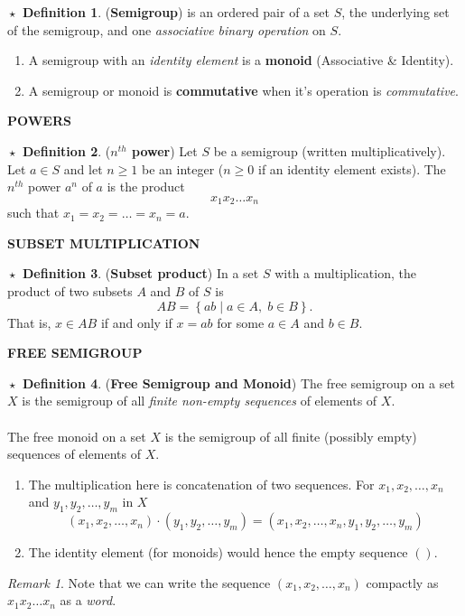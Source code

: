 \documentclass{article}
\theoremstyle{definition}
\newtheorem{definition}{$\boxed{\star}$ Definition}
\theoremstyle{remark}
\newtheorem*{remark}{Remark}
\theoremstyle{definition}
\theoremstyle{definition}
\theoremstyle{definition}
\theoremstyle{proof}
\begin{document}
\hrulefill
\begin{definition}
	(\textbf{Semigroup}) is an ordered pair of a set $ S $, the underlying set of the semigroup, and one \textit{associative binary operation} on $ S $.
	\begin{enumerate}
		\item{A semigroup with an \textit{identity element} is a \textbf{monoid} (Associative \& Identity).}
		\item{A semigroup or monoid is \textbf{commutative} when it's operation is \textit{commutative}.}
	\end{enumerate}
\end{definition}
\hrulefill
\textbf{POWERS}
\hrulefill
\begin{definition}
	(\textbf{$ n^{th} $ power}) Let $ S $ be a semigroup (written multiplicatively). Let $ a\in S $ and let $ n\ge 1 $ be an integer ($ n\ge 0 $ if an identity element exists). The $ n^{th} $ power $ a^n $ of $ a $ is the product
	\[x_1x_2\dots x_n\]
	such that $ x_1 = x_2 = \dots = x_n = a $.
\end{definition}
\hrulefill
\textbf{SUBSET MULTIPLICATION}
\hrulefill
\begin{definition}
	(\textbf{Subset product}) In a set $ S $ with a multiplication, the product of two subsets $ A $ and $ B $ of $ S $ is 
	\[AB = \left \{ab \;\vert\; a\in A,\; b\in B\right \}.\]
	That is, $ x\in AB $ if and only if $ x = ab $ for some $ a\in A $ and $ b\in B $.
\end{definition}
\hrulefill
\textbf{FREE SEMIGROUP}
\hrulefill
\begin{definition}
	(\textbf{Free Semigroup and Monoid})  The free semigroup on a set $ X $ is the semigroup of all \textit{finite non-empty sequences} of elements of $ X $.\\\\
	The free monoid on a set $ X $ is the semigroup of all finite (possibly empty) sequences of elements of $ X $.
	\begin{enumerate}
		\item{The multiplication here is concatenation of two sequences. For $ x_1,x_2,\dots,x_n$ and $y_1,y_2,\dots,y_m $ in $ X $
			\[(x_1,x_2,\dots,x_n) \cdot (y_1,y_2,\dots,y_m) = (x_1,x_2,\dots,x_n,y_1,y_2,\dots,y_m)\]
	}
		\item{The identity element (for monoids) would hence the empty sequence $ () $.}
	\end{enumerate}
\begin{remark}
	Note that we can write the sequence $ (x_1,x_2,\dots,x_n) $ compactly as $ x_1x_2\dots x_n $ as a \textit{word}.
\end{remark}
\end{definition}
\end{document}
